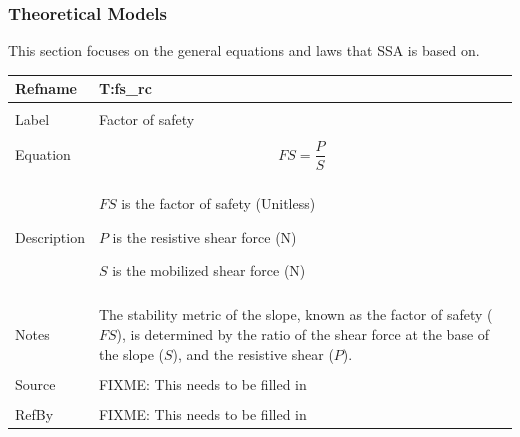 \documentclass[12pt]{article}
\begin{document}
\subsubsection{Theoretical Models}
\label{Sec:TMs}
This section focuses on the general equations and laws that SSA is based on.
~\newline
\noindent \begin{minipage}{\textwidth}
\begin{tabular}{p{} p{}}
\toprule \textbf{Refname} & \textbf{T:fs\_rc}
\label{T:fs\_rc}
\\ \midrule \\
Label & Factor of safety
\\ \midrule \\
Equation & \begin{dmath}
           FS=\frac{P}{S}
           \end{dmath}
\\ \midrule \\
Description & \begin{symbDescription}
              \item{$FS$ is the factor of safety (Unitless)}
              \item{$P$ is the resistive shear force (N)}
              \item{$S$ is the mobilized shear force (N)}
              \end{symbDescription}
\\ \midrule \\
Notes & The stability metric of the slope, known as the factor of safety ($FS$), is determined by the ratio of the shear force at the base of the slope ($S$), and the resistive shear ($P$).
\\ \midrule \\
Source & FIXME: This needs to be filled in
\\ \midrule \\
RefBy & FIXME: This needs to be filled in
\\ \bottomrule \end{tabular}
\end{minipage}\\
~\newline
\end{document}
